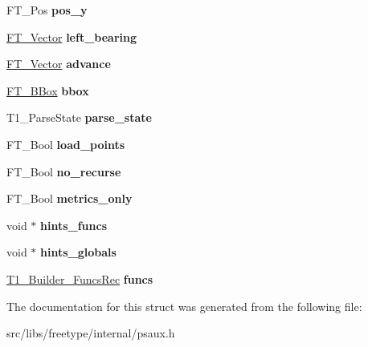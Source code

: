 \begin{DoxyCompactItemize}
\item 
\hypertarget{struct_t1___builder_rec___ad389bf0d5182b677ed3dba05a9612530}{
FT\_\-Pos {\bfseries pos\_\-y}}
\label{struct_t1___builder_rec___ad389bf0d5182b677ed3dba05a9612530}

\item 
\hypertarget{struct_t1___builder_rec___a86247b8fd87873ef93aecf0e27e4b6dc}{
\hyperlink{struct_f_t___vector__}{FT\_\-Vector} {\bfseries left\_\-bearing}}
\label{struct_t1___builder_rec___a86247b8fd87873ef93aecf0e27e4b6dc}

\item 
\hypertarget{struct_t1___builder_rec___a48575715ea96f16bdc7077996013ef9e}{
\hyperlink{struct_f_t___vector__}{FT\_\-Vector} {\bfseries advance}}
\label{struct_t1___builder_rec___a48575715ea96f16bdc7077996013ef9e}

\item 
\hypertarget{struct_t1___builder_rec___a534c6d954f8cf791a94489350314a8f7}{
\hyperlink{struct_f_t___b_box__}{FT\_\-BBox} {\bfseries bbox}}
\label{struct_t1___builder_rec___a534c6d954f8cf791a94489350314a8f7}

\item 
\hypertarget{struct_t1___builder_rec___afaa675cc3601ed05ed86bc474153094b}{
T1\_\-ParseState {\bfseries parse\_\-state}}
\label{struct_t1___builder_rec___afaa675cc3601ed05ed86bc474153094b}

\item 
\hypertarget{struct_t1___builder_rec___acaf59a770471bf90b5b7d9f72e97e64e}{
FT\_\-Bool {\bfseries load\_\-points}}
\label{struct_t1___builder_rec___acaf59a770471bf90b5b7d9f72e97e64e}

\item 
\hypertarget{struct_t1___builder_rec___a0369f22bec404666e1c7dc6bb648ac28}{
FT\_\-Bool {\bfseries no\_\-recurse}}
\label{struct_t1___builder_rec___a0369f22bec404666e1c7dc6bb648ac28}

\item 
\hypertarget{struct_t1___builder_rec___ab4c509b363e5a5f4da25460413e9364f}{
FT\_\-Bool {\bfseries metrics\_\-only}}
\label{struct_t1___builder_rec___ab4c509b363e5a5f4da25460413e9364f}

\item 
\hypertarget{struct_t1___builder_rec___aeed4b5ebe5256cc07e31159b4a4a95ff}{
void $\ast$ {\bfseries hints\_\-funcs}}
\label{struct_t1___builder_rec___aeed4b5ebe5256cc07e31159b4a4a95ff}

\item 
\hypertarget{struct_t1___builder_rec___ae94605dc79c1d54c1b59423046b38671}{
void $\ast$ {\bfseries hints\_\-globals}}
\label{struct_t1___builder_rec___ae94605dc79c1d54c1b59423046b38671}

\item 
\hypertarget{struct_t1___builder_rec___acecf3c6c134bccd36a1d30e10147ca54}{
\hyperlink{struct_t1___builder___funcs_rec__}{T1\_\-Builder\_\-FuncsRec} {\bfseries funcs}}
\label{struct_t1___builder_rec___acecf3c6c134bccd36a1d30e10147ca54}

\end{DoxyCompactItemize}


The documentation for this struct was generated from the following file:\begin{DoxyCompactItemize}
\item 
src/libs/freetype/internal/psaux.h\end{DoxyCompactItemize}
